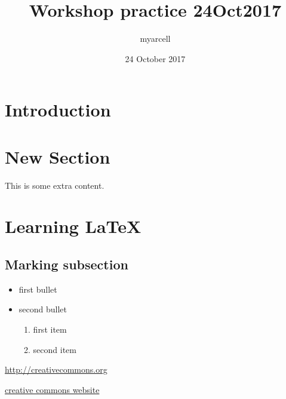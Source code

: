\documentclass{article}
\title{Workshop practice 24Oct2017}
\author{myarcell }
\date{24 October 2017}
\begin{document}
\maketitle

\section{Introduction}

\section{New Section}

This is some extra content.

\section{Learning LaTeX}

\subsection{Marking subsection}

\begin{itemize}
    \item first bullet
    \item second bullet
    
    \begin{enumerate}
        \item first item
        \item second item
        
    \end{enumerate}
\end{itemize}


\url{http://creativecommons.org}

\href{http://creativecommons.org}{creative commons website}
\end{document}
